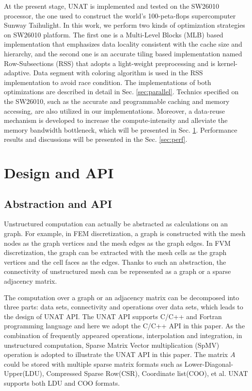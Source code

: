\documentclass[5p,times]{elsarticle}
\begin{document}
At the present stage, UNAT is implemented and tested on the SW26010 processor, the one used to construct the world’s 100-peta-flops supercomputer Sunway Taihulight. In this work, we perform two kinds of optimization strategies on SW26010 platform. The first one is a Multi-Level Blocks (MLB) based implementation that emphasizes data locality consistent with the cache size and hierarchy, and the second one is an accurate tiling based implementation named Row-Subsections (RSS) that adopts a light-weight preprocessing and is kernel-adaptive. Data segment with coloring algorithm is used in the RSS implementation to avoid race condition. The implementations of both optimizations are described in detail in Sec. \ref{sec:parallel}. Technics specified on the SW26010, such as the accurate and programmable caching and memory accessing, are also utilized in our implementations. Moreover, a data-reuse mechanism is developed to increase the compute-intensity and alleviate the memory bandwidth bottleneck, which will be presented in Sec. \ref{sec:design}. Performance results and discussions will be presented in the Sec. \ref{sec:perf}.

\section{Design and API}
\label{sec:design}

\subsection{Abstraction and API}

Unstructured computation can actually be abstracted as calculations on an graph. For example, in FEM discretization, a graph is constructed with the mesh nodes as the graph vertices and the mesh edges as the graph edges. In FVM discretization, the graph can be extracted with the mesh cells as the graph vertices and the cell faces as the edges. Thanks to such an abstraction, the connectivity of unstructured mesh can be represented as a graph or a sparse adjacency matrix.

The computation over a graph or an adjacency matrix can be decomposed into three parts: data sets, connectivity and operations over data sets, which leads to the design of UNAT API. The UNAT API supports C/C++ and Fortran programming language and here we adopt the C/C++ API in this paper. As the combination of frequently appeared operations, interpolation and integration, in unstructured computation, Sparse Matrix Vector multiplication (SpMV) operation is adopted to illustrate the UNAT API in this paper. The matrix $A$ could be stored with multiple sparse matrix formats such as Lower-Diagonal-Upper(LDU), Compressed Sparse Row(CSR), Coordinate list(COO), et al. UNAT supports both LDU and COO formats.
\end{document}

